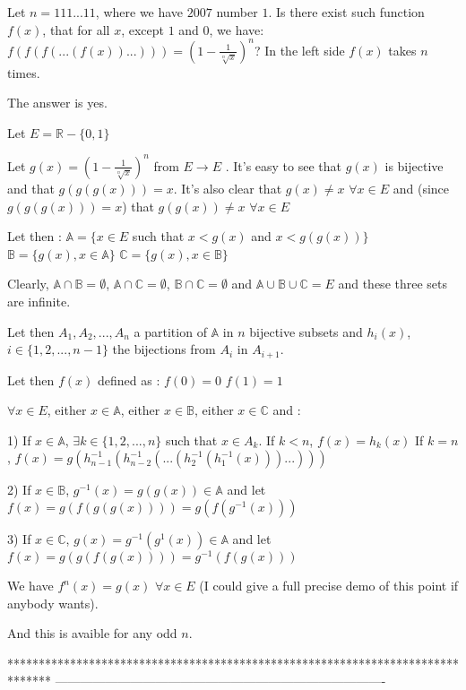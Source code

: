 \begin{mysolution}
	\begin{tcolorbox}Let $ n = 111...11$, where we have $ 2007$ number $ 1$. Is there exist such function $ f(x)$,
that for all $ x$, except $ 1$ and $ 0$, we have:
$ f(f(f(...(f(x))...))) = (1 - \frac {1}{\sqrt [n]{x}})^{n}$?
In the left side $ f(x)$ takes $ n$ times.\end{tcolorbox}

The answer is yes.

Let $ E=\mathbb{R}-\{0,1\}$

Let $ g(x)=(1 - \frac {1}{\sqrt [n]{x}})^{n}$ from $ E\rightarrow E$ . It's easy to see that $ g(x)$ is bijective and that $ g(g(g(x)))=x$.
It's also clear that $ g(x)\neq x$ $ \forall x\in E$ and (since $ g(g(g(x)))=x$) that $ g(g(x))\neq x$ $ \forall x\in E$

Let then :
$ \mathbb{A}=\{x\in E$ such that $ x<g(x)$ and $ x<g(g(x))\}$
$ \mathbb{B}=\{g(x),x\in\mathbb{A}\}$
$ \mathbb{C}=\{g(x),x\in\mathbb{B}\}$

Clearly, $ \mathbb{A}\cap\mathbb{B}=\emptyset$, $ \mathbb{A}\cap\mathbb{C}=\emptyset$, $ \mathbb{B}\cap\mathbb{C}=\emptyset$ and $ \mathbb{A}\cup\mathbb{B}\cup\mathbb{C}=E$ and these three sets are infinite.

Let then $ A_1,A_2,...,A_n$ a partition of $ \mathbb{A}$ in $ n$ bijective subsets and $ h_i(x)$, $ i\in\{1,2,...,n-1\}$ the bijections from $ A_i$ in $ A_{i+1}$.

Let then $ f(x)$ defined as :
$ f(0)=0$
$ f(1)=1$

$ \forall x\in E$, either $ x\in\mathbb{A}$, either $ x\in\mathbb{B}$, either $ x\in\mathbb{C}$ and :

1) If $ x\in\mathbb{A}$, $ \exists k\in\{1,2,...,n\}$ such that $ x\in A_k$.
If $ k<n$, $ f(x)=h_k(x)$
If $ k=n$, $ f(x)=g(h_{n-1}^{-1}(h_{n-2}^{-1}(...(h_2^{-1}(h_1^{-1}(x)))...)))$

2) If $ x\in\mathbb{B}$, $ g^{-1}(x)=g(g(x))\in\mathbb{A}$ and let $ f(x)=g(f(g(g(x))))=g(f(g^{-1}(x)))$

3) If $ x\in\mathbb{C}$, $ g(x)=g^{-1}(g^{1}(x))\in\mathbb{A}$ and let $ f(x)=g(g(f(g(x))))=g^{-1}(f(g(x)))$

We have $ f^n(x)=g(x)$ $ \forall x\in E$ (I could give a full precise demo of this point if anybody wants).

And this is avaible for any odd $ n$.
\end{mysolution}
*******************************************************************************
-------------------------------------------------------------------------------

